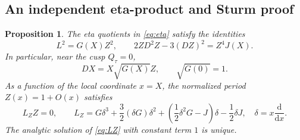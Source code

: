 \documentclass[11pt,a4paper]{article}
\newtheorem{proposition}[theorem]{Proposition}
\theoremstyle{remark}
\newcommand{\dd}{\mathrm d}
\begin{document}
\subsection{An independent eta-product and Sturm proof}
\begin{proposition}\label{prop:modparam}
The eta quotients in \eqref{eq:eta} satisfy the identities
\begin{equation}\label{eq:modidentities}
 L^2=G(X)Z^2,\qquad
 2Z D^2Z-3(DZ)^2=Z^4J(X).
\end{equation}
In particular, near the cusp $Q_\tau=0$,
\begin{equation}\label{eq:DXlocal}
 DX=X\sqrt{G(X)}Z,\qquad \sqrt{G(0)}=1.
\end{equation}
As a function of the local coordinate $x=X$, the normalized period
$Z(x)=1+O(x)$ satisfies
\begin{equation}\label{eq:LZ}
 L_ZZ=0,\qquad
 L_Z=G\delta^3+\frac32(\delta G)\delta^2
             +\left(\frac12\delta^2G-J\right)\delta-\frac12\delta J,
 \quad \delta=x\frac{\dd}{\dd x}.
\end{equation}
The analytic solution of \eqref{eq:LZ} with constant term $1$ is unique.
\end{proposition}
\end{document}

